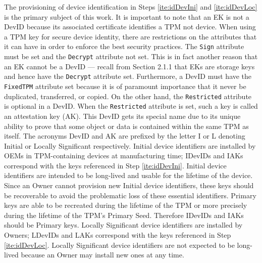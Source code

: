The provisioning of device identification in Steps \ref{ite:idDevIni} and \ref{ite:idDevLoc} is the primary subject of this work. It is important to note that an EK is not a DevID because its associated certificate identifies a TPM not device. 
When using a TPM key for secure device identity, there are restrictions on the attributes that it can have in order to enforce the best security practices. The \verb|Sign| attribute must be set and the \verb|Decrypt| attribute not set. This is in fact another reason that an EK cannot be a DevID --- recall from Section 2.1.1 that EKs are storage keys and hence have the \verb|Decrypt| attribute set. Furthermore, a DevID must have the \verb|FixedTPM| attribute set because it is of paramount importance that it never be duplicated, transferred, or copied. On the other hand, the \verb|Restricted| attribute is optional in a DevID. When the \verb|Restricted| attribute is set, such a key is called an attestation key (AK). This DevID gets its special name due to its unique ability to prove that some object or data is contained within the same TPM as itself. The acronyms DevID and AK are prefixed by the letter I or L denoting Initial or Locally Significant respectively. Initial device identifiers are installed by OEMs in TPM-containing devices at manufacturing time; IDevIDs and IAKs correspond with the keys referenced in Step \ref{ite:idDevIni}. Initial device identifiers are intended to be long-lived and usable for the lifetime of the device. Since an Owner cannot provision new Initial device identifiers, these keys should be recoverable to avoid the problematic loss of these essential identifiers. Primary keys are able to be recreated during the lifetime of the TPM or more precisely during the lifetime of the TPM’s Primary Seed. Therefore IDevIDs and IAKs should be Primary keys. Locally Significant device identifiers are installed by Owners; LDevIDs and LAKs correspond with the keys referenced in Step \ref{ite:idDevLoc}. Locally Significant device identifiers are not expected to be long-lived because an Owner may install new ones at any time. 


